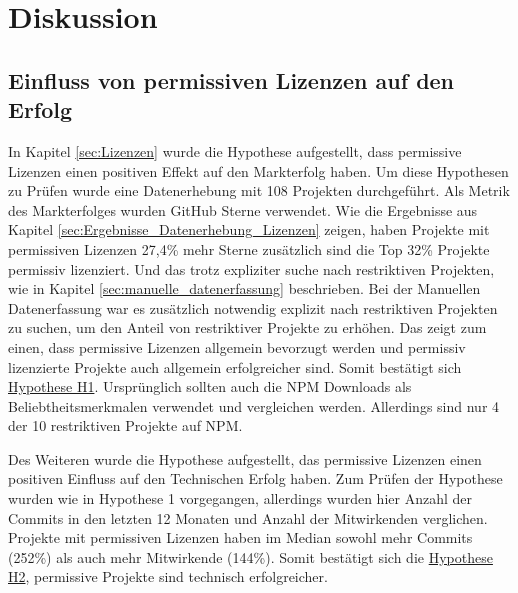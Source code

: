 \chapter{Diskussion}




\section{Einfluss von permissiven Lizenzen auf den Erfolg}


In Kapitel \ref{sec:Lizenzen} wurde die Hypothese aufgestellt, dass permissive Lizenzen einen positiven
Effekt auf den Markterfolg haben.
Um diese Hypothesen zu Prüfen wurde eine Datenerhebung mit 108 Projekten durchgeführt. Als Metrik des
Markterfolges wurden GitHub Sterne verwendet.
Wie die Ergebnisse aus Kapitel \ref{sec:Ergebnisse_Datenerhebung_Lizenzen} zeigen, haben Projekte mit
permissiven Lizenzen 27,4\% mehr Sterne zusätzlich sind die Top 32\% Projekte permissiv lizenziert.  
Und das trotz expliziter suche nach restriktiven Projekten, wie in Kapitel \ref{sec:manuelle_datenerfassung}
beschrieben. Bei der Manuellen Datenerfassung war es zusätzlich notwendig explizit nach restriktiven 
Projekten zu suchen, um den Anteil von restriktiver Projekte zu erhöhen. Das zeigt zum einen, dass 
permissive Lizenzen allgemein bevorzugt werden und permissiv lizenzierte Projekte auch allgemein 
erfolgreicher sind. Somit bestätigt sich \hyperref[H:1]{Hypothese H1}.
Ursprünglich sollten auch die NPM Downloads als Beliebtheitsmerkmalen verwendet und vergleichen
werden. Allerdings sind nur 4 der 10 restriktiven Projekte auf NPM.


\bigskip
\noindent
Des Weiteren wurde die Hypothese aufgestellt, das permissive Lizenzen einen positiven Einfluss auf den
Technischen Erfolg haben.
Zum Prüfen der Hypothese wurden wie in Hypothese 1 vorgegangen, allerdings wurden hier 
Anzahl der Commits in den letzten 12 Monaten und Anzahl der Mitwirkenden
verglichen.
Projekte mit permissiven Lizenzen haben im Median sowohl mehr Commits (252\%) als auch mehr Mitwirkende
(144\%). Somit bestätigt sich die \hyperref[H:2]{Hypothese H2}, permissive Projekte sind technisch 
erfolgreicher.


